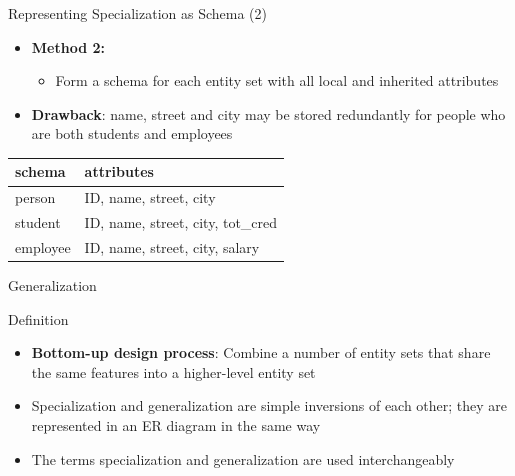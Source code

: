 \documentclass[aspectratio=169, xcolor=dvipsnames]{beamer}
\begin{document}
\begin{frame}{Representing Specialization as Schema (2)}
    \begin{itemize}[<+->]
        \item \textbf{Method 2:}
        \begin{itemize}
            \item[$\triangleright$] Form a schema for each entity set with all local and inherited attributes
        \end{itemize}
        \item \textbf{Drawback}: name, street and city may be stored redundantly for people who are both students and employees
    \end{itemize}
    
    \begin{table}[]
        \centering
        \begin{tabular}{|l|l|}
        \hline
        \textbf{schema} & \textbf{attributes} \\ \hline
        person & ID, name, street, city \\ 
        student & ID, name, street, city, tot\_cred \\ 
        employee & ID, name, street, city, salary \\ \hline
        \end{tabular}
    \end{table}
\end{frame}

\begin{frame}{Generalization}
    \begin{block}{Definition}
        \begin{itemize}[<+->]
            \item \textbf{Bottom-up design process}: Combine a number of entity sets that share the same features into a higher-level entity set
            \item Specialization and generalization are simple inversions of each other; they are represented in an ER diagram in the same way
            \item The terms specialization and generalization are used interchangeably
        \end{itemize}
    \end{block}
\end{frame}
\end{document}
